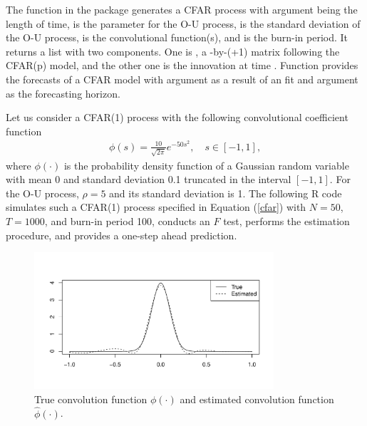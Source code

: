 The function  in the  package generates a CFAR process with argument  being the length of time,  is the parameter for the O-U process,  is the standard deviation of the O-U process,  is the convolutional function(s), and  is the burn-in period. It returns a list with two components. One is , a -by-(+1) matrix following the CFAR(p) model, and the other one  is the innovation at time .
Function  provides the forecasts of a CFAR model with argument  as a result of an  fit and argument  as the forecasting horizon.

Let us consider a CFAR(1) process with the following convolutional coefficient function
\begin{align}\label{cfar}
\phi(s)=\frac{10}{\sqrt{2\pi }}e^{-50s^2}, \quad s\in[-1,1],
\end{align}
where $\phi(\cdot)$ is the probability density function of a Gaussian random variable with mean 0 and standard deviation 0.1 truncated in the interval $[-1,1]$. For the O-U process, $\rho=5$ and its standard deviation is 1. The following {R} code simulates such a CFAR(1) process specified in Equation (\ref{cfar}) with $N=50$, $T=1000$, and burn-in period 100, conducts an $F$ test, performs the estimation procedure,
and provides a one-step ahead prediction.



\begin{figure}[t!]
\centering
\includegraphics[width=3.5in]{article-cfar_plot}
\caption{True convolution function $\phi(\cdot)$ and estimated convolution function $\hat{\phi}(\cdot)$.}
\label{fig:cfar}
\end{figure}



